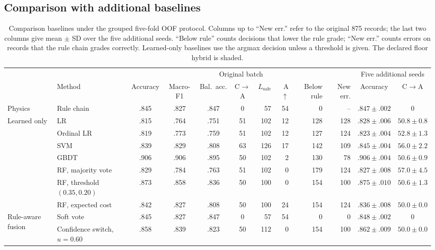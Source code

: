 \documentclass[journal]{IEEEtran}
\newcommand{\Lsafe}{L_{\mathrm{safe}}}
\begin{document}
\subsection{Comparison with additional baselines}
\label{sec:res-baselines}
\begin{table}[t]
\caption{Comparison baselines under the grouped five-fold OOF protocol. Columns up to ``New err.'' refer to the original 875 records; the last two columns give mean $\pm$ SD over the five additional seeds. ``Below rule'' counts decisions that lower the rule grade; ``New err.'' counts errors on records that the rule chain grades correctly. Learned-only baselines use the argmax decision unless a threshold is given. The declared floor hybrid is shaded.}
\label{tab:baselines}
\centering
\footnotesize
\setlength{\tabcolsep}{3.4pt}
\begin{tabular}{@{}llccccrrrrcc@{}}
\toprule
 & & \multicolumn{8}{c}{Original batch} & \multicolumn{2}{c}{Five additional seeds} \\
\cmidrule(lr){3-10}\cmidrule(l){11-12}
 & Method & Accuracy & Macro-F1 & Bal.\ acc. & C$\rightarrow$A & $\Lsafe$ & A$\uparrow$ & Below rule & New err. & Accuracy & C$\rightarrow$A \\
\midrule
 Physics & Rule chain & .845 & .827 & .847 & 0 & 57 & 54 & 0 & -- & $.847\pm.002$ & 0 \\
\midrule
 \multirow{7}{*}{Learned only} & LR & .815 & .764 & .751 & 51 & 102 & 12 & 128 & 128 & $.828\pm.006$ & $50.8\pm0.8$ \\
  & Ordinal LR & .819 & .773 & .759 & 51 & 102 & 12 & 127 & 124 & $.823\pm.004$ & $52.8\pm1.3$ \\
  & SVM & .839 & .829 & .808 & 63 & 126 & 17 & 142 & 109 & $.845\pm.004$ & $56.0\pm2.2$ \\
  & GBDT & .906 & .906 & .895 & 50 & 102 & 2 & 130 & 78 & $.906\pm.004$ & $50.6\pm0.9$ \\
  & RF, majority vote & .829 & .784 & .763 & 51 & 102 & 0 & 179 & 124 & $.827\pm.008$ & $57.0\pm4.5$ \\
  & RF, threshold $(0.35,0.20)$ & .873 & .858 & .836 & 50 & 100 & 0 & 154 & 100 & $.875\pm.010$ & $50.6\pm1.3$ \\
  & RF, expected cost & .842 & .827 & .808 & 50 & 100 & 24 & 154 & 124 & $.836\pm.008$ & $50.0\pm0.0$ \\
\midrule
 \multirow{3}{*}{Rule-aware fusion} & Soft vote & .845 & .827 & .847 & 0 & 57 & 54 & 0 & 0 & $.848\pm.002$ & 0 \\
  & Confidence switch, $u=0.60$ & .858 & .839 & .823 & 50 & 112 & 0 & 154 & 100 & $.862\pm.009$ & $50.0\pm0.0$ \\

\end{tabular}
\end{table}
\end{document}
